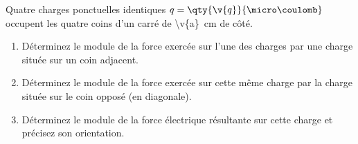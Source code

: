 Quatre charges ponctuelles identiques $q = \qty{\v{q}}{\micro\coulomb}$ occupent les quatre coins d'un carré de \qty{\v{a}}{cm} de côté.

\begin{enumerate}[label=\alph*)]
    \item Déterminez le module de la force exercée sur l'une des charges par une charge située sur un coin adjacent.
    \item Déterminez le module de la force exercée sur cette même charge par la charge située sur le coin opposé (en diagonale).
    \item Déterminez le module de la force électrique résultante sur cette charge et précisez son orientation.
\end{enumerate}
